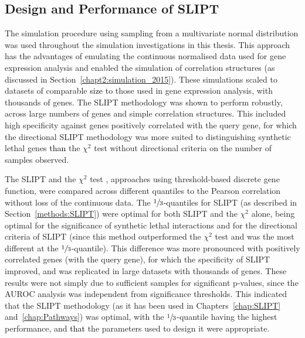 \subsection{Design and Performance of SLIPT}
\label{chapt5:sim_design}

The simulation procedure using sampling from a multivariate normal distribution was used throughout the simulation investigations in this thesis. This approach has the advantages of emulating the continuous normalised  data used for \gls{gene expression} analysis and enabled the simulation of correlation structures (as discussed in Section~\ref{chapt2:simulation_2015}). These simulations scaled to datasets of comparable \textcolor{black}{size} to those used in \gls{gene expression} analysis, with thousands of genes. The \gls{SLIPT} methodology was shown to perform robustly, across large numbers of genes and simple correlation structures. This included high specificity against genes positively correlated with the query gene, for which the directional \gls{SLIPT} methodology was more suited to distinguishing \gls{synthetic lethal} genes \textcolor{black}{than} the $\chi^2$ test without directional criteria on the number of samples observed.

The \gls{SLIPT} and the $\chi^2$ test , approaches using threshold-based discrete gene function, were compared across different quantiles to the Pearson correlation without loss of the continuous  data. The $\sfrac{1}{3}$-quantiles for \gls{SLIPT} (as described in Section~\ref{methods:SLIPT}) were optimal for both \gls{SLIPT} and the $\chi^2$ alone, being optimal for the significance of \gls{synthetic lethal} interactions and for the directional criteria of \gls{SLIPT} (since this method outperformed the $\chi^2$ test and was the most different at the $\sfrac{1}{3}$-quantile). This difference was more pronounced with positively correlated genes (with the query gene), for which the specificity of \gls{SLIPT} improved, and was replicated in large datasets with thousands of genes. These results were not simply due to sufficient samples for significant p-values, since the \gls{AUROC} analysis was independent from significance thresholds. This indicated that the \gls{SLIPT} methodology (as it has been used in Chapters~\ref{chap:SLIPT} and~\ref{chap:Pathways}) was optimal, with the $\sfrac{1}{3}$-quantile having the highest performance, and \textcolor{black}{that} the parameters used to design it were appropriate.

